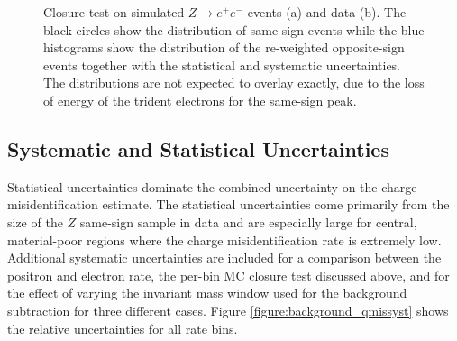 \begin{figure}[htb!]
\begin{minipage}[h]{0.5\textwidth}
\end{minipage}\hfill
  \caption{Closure test on simulated $Z\rightarrow e^+e^-$ events (a)   and data (b). 
      The black circles show the distribution of same-sign events while the blue histograms
      show the distribution of the re-weighted opposite-sign events together with the statistical and systematic uncertainties. The distributions are not
    expected to overlay exactly, due to the loss of energy of the trident electrons for the
    same-sign peak. \label{figure:background_clMll}}
\end{figure}


\subsection{Systematic and Statistical Uncertainties}

Statistical uncertainties dominate the combined uncertainty on the charge misidentification estimate. The statistical uncertainties come primarily from the size of the $Z$ same-sign sample in data and are especially large for central, material-poor regions where the charge misidentification rate is extremely low. Additional systematic uncertainties are included for a comparison between the positron and electron rate, the per-bin MC closure test discussed above, and for the effect of varying the invariant mass window used for the background subtraction for three different cases. Figure \ref{figure:background_qmissyst} shows the relative uncertainties for all rate bins.



